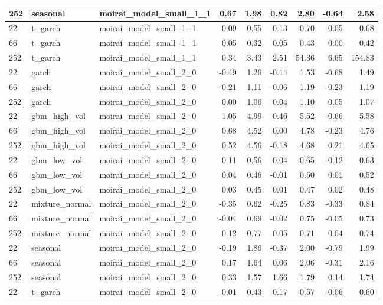{\begin{tabular}{lllrrrrrr}
252 & seasonal & moirai\_model\_small\_1\_1 & 0.67 & 1.98 & 0.82 & 2.80 & -0.64 & 2.58 \\
\midrule
22 & t\_garch & moirai\_model\_small\_1\_1 & 0.09 & 0.55 & 0.13 & 0.70 & 0.05 & 0.68 \\
66 & t\_garch & moirai\_model\_small\_1\_1 & 0.05 & 0.32 & 0.05 & 0.43 & 0.00 & 0.42 \\
252 & t\_garch & moirai\_model\_small\_1\_1 & 0.34 & 3.43 & 2.51 & 54.36 & 6.65 & 154.83 \\
\midrule
22 & garch & moirai\_model\_small\_2\_0 & -0.49 & 1.26 & -0.14 & 1.53 & -0.68 & 1.49 \\
66 & garch & moirai\_model\_small\_2\_0 & -0.21 & 1.11 & -0.06 & 1.19 & -0.23 & 1.19 \\
252 & garch & moirai\_model\_small\_2\_0 & 0.00 & 1.06 & 0.04 & 1.10 & 0.05 & 1.07 \\
\midrule
22 & gbm\_high\_vol & moirai\_model\_small\_2\_0 & 1.05 & 4.99 & 0.46 & 5.52 & -0.66 & 5.58 \\
66 & gbm\_high\_vol & moirai\_model\_small\_2\_0 & 0.68 & 4.52 & 0.00 & 4.78 & -0.23 & 4.76 \\
252 & gbm\_high\_vol & moirai\_model\_small\_2\_0 & 0.52 & 4.56 & -0.18 & 4.68 & 0.21 & 4.65 \\
\midrule
22 & gbm\_low\_vol & moirai\_model\_small\_2\_0 & 0.11 & 0.56 & 0.04 & 0.65 & -0.12 & 0.63 \\
66 & gbm\_low\_vol & moirai\_model\_small\_2\_0 & 0.04 & 0.46 & -0.01 & 0.50 & 0.01 & 0.52 \\
252 & gbm\_low\_vol & moirai\_model\_small\_2\_0 & 0.03 & 0.45 & 0.01 & 0.47 & 0.02 & 0.48 \\
\midrule
22 & mixture\_normal & moirai\_model\_small\_2\_0 & -0.35 & 0.62 & -0.25 & 0.83 & -0.33 & 0.84 \\
66 & mixture\_normal & moirai\_model\_small\_2\_0 & -0.04 & 0.69 & -0.02 & 0.75 & -0.05 & 0.73 \\
252 & mixture\_normal & moirai\_model\_small\_2\_0 & 0.12 & 0.77 & 0.05 & 0.71 & 0.04 & 0.74 \\
\midrule
22 & seasonal & moirai\_model\_small\_2\_0 & -0.19 & 1.86 & -0.37 & 2.00 & -0.79 & 1.99 \\
66 & seasonal & moirai\_model\_small\_2\_0 & 0.17 & 1.64 & 0.06 & 2.06 & -0.31 & 2.16 \\
252 & seasonal & moirai\_model\_small\_2\_0 & 0.33 & 1.57 & 1.66 & 1.79 & 0.14 & 1.74 \\
\midrule
22 & t\_garch & moirai\_model\_small\_2\_0 & -0.01 & 0.43 & -0.17 & 0.57 & -0.06 & 0.60 \\

\end{tabular}}
